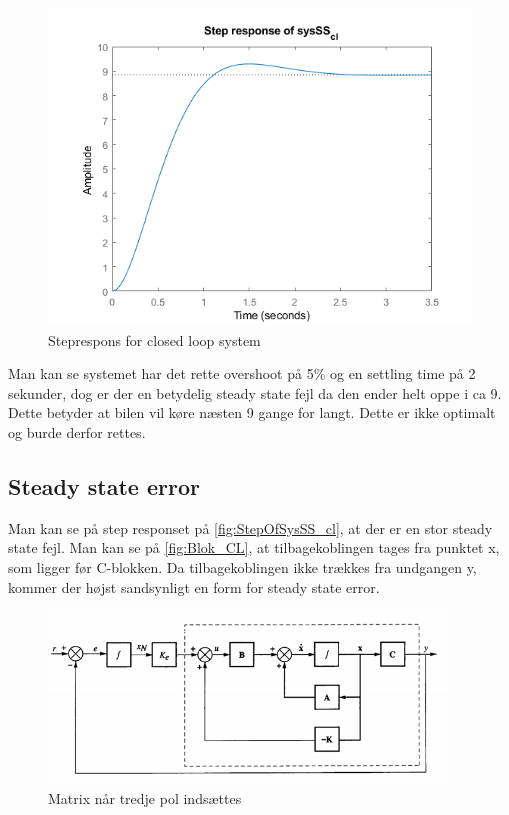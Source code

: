 \begin{figure}[H]
	\centering
	\includegraphics[width = 400pt]{Img/StepOfSysSS_cl.png}
	\caption{Steprespons for closed loop system}
	\label{fig:StepOfSysSS_cl}
\end{figure}

Man kan se systemet har det rette overshoot på 5\% og en settling time på 2 sekunder, dog er der en betydelig steady state fejl da den ender helt oppe i ca 9. Dette betyder at bilen vil køre næsten 9 gange for langt. Dette er ikke optimalt og burde derfor rettes.

\subsection{Steady state error}
Man kan se på step responset på \autoref{fig:StepOfSysSS_cl}, at der er en stor steady state fejl. Man kan se på \autoref{fig:Blok_CL}, at tilbagekoblingen tages fra punktet x, som ligger før C-blokken. Da tilbagekoblingen ikke trækkes fra undgangen y, kommer der højst sandsynligt en form for steady state error.

\begin{figure}[H]
	\centering
	\includegraphics[width = 300pt]{Img/SteadyState_blok.png}
	\caption{Matrix når tredje pol indsættes}
	\label{fig:SteadyState_blok}
\end{figure}

